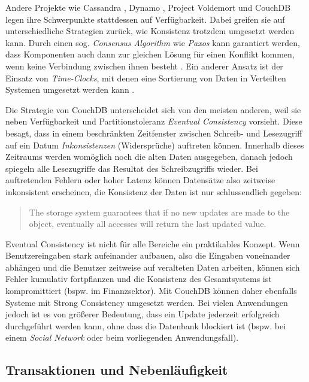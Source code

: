Andere Projekte wie Cassandra \cite{cassandra:website}, Dynamo \cite{dynamo:website}, Project Voldemort \cite{voldemort:website} und CouchDB legen ihre Schwerpunkte stattdessen auf Verfügbarkeit. Dabei greifen sie auf unterschiedliche Strategien zurück, wie Konsistenz trotzdem umgesetzt werden kann. Durch einen sog. \textit{Consensus Algorithm} wie \textit{Paxos}  kann garantiert werden, dass Komponenten auch dann zur gleichen Lösung für einen Konflikt kommen, wenn keine Verbindung zwischen ihnen besteht . Ein anderer Ansatz ist der Einsatz von \textit{Time-Clocks}, mit denen eine Sortierung von Daten in Verteilten Systemen umgesetzt werden kann . 

Die Strategie von CouchDB unterscheidet sich von den meisten anderen, weil sie neben Verfügbarkeit und Partitionstoleranz \textit{Eventual Consistency} vorsieht. Diese besagt, dass in einem beschränkten Zeitfenster zwischen Schreib- und Lesezugriff auf ein Datum \textit{Inkonsistenzen} (Widersprüche) auftreten können. Innerhalb dieses Zeitraums werden womöglich noch die alten Daten ausgegeben, danach jedoch spiegeln alle Lesezugriffe das Resultat des Schreibzugriffs wieder. Bei auftretenden Fehlern oder hoher Latenz können Datensätze also zeitweise inkonsistent erscheinen, die Konsistenz der Daten ist nur schlussendlich gegeben:

\begin{quote}
The storage system guarantees that if no new updates are made to the object, eventually all accesses will return the last updated value. 
\end{quote}

Eventual Consistency ist nicht für alle Bereiche ein praktikables Konzept. Wenn Benutzereingaben stark aufeinander aufbauen, also die Eingaben voneinander abhängen und die Benutzer zeitweise auf veralteten Daten arbeiten, können sich Fehler kumulativ fortpflanzen und die Konsistenz des Gesamtsystems ist kompromittiert (bspw. im Finanzsektor). Mit CouchDB können daher ebenfalls Systeme mit Strong Consistency umgesetzt werden. Bei vielen Anwendungen jedoch ist es von größerer Bedeutung, dass ein Update jederzeit erfolgreich durchgeführt werden kann, ohne dass die Datenbank blockiert ist (bspw. bei einem \textit{Social Network} oder beim vorliegenden Anwendungsfall). 





\subsection{Transaktionen und Nebenläufigkeit}
\label{subsec:concurrency}


